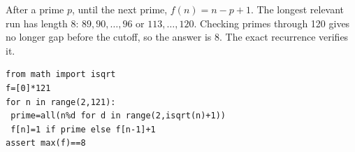 After a prime $p$, until the next prime, $f(n)=n-p+1$. The longest relevant run has length 8: $89,90,\ldots,96$ or $113,\ldots,120$. Checking primes through 120 gives no longer gap before the cutoff, so the answer is $\boxed8$. The exact recurrence verifies it.
\begin{verbatim}
from math import isqrt
f=[0]*121
for n in range(2,121):
 prime=all(n%d for d in range(2,isqrt(n)+1))
 f[n]=1 if prime else f[n-1]+1
assert max(f)==8
\end{verbatim}
